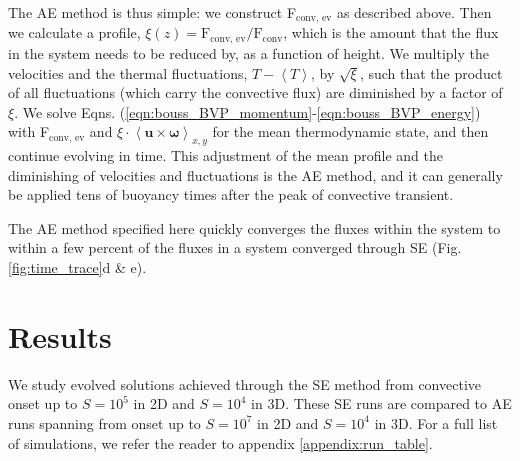 \documentclass[aps, pre, onecolumn, nofootinbib, notitlepage, groupedaddress, amsfonts, amssymb, amsmath, longbibliography]{revtex4-1}
\newcommand{\angles}[1]{\ensuremath{\left\langle #1 \right\rangle}}
\begin{document}
The AE method is thus simple: we construct F$_{\text{conv, ev}}$ as described above.
Then we calculate a profile, 
$\xi(z) = \text{F}_{\text{conv, ev}}/\text{F}_{\text{conv}}$, which is the amount that the
flux in the system needs to be reduced by, as a function of height.
We multiply the velocities
and the thermal fluctuations, $T - \angles{T}$, by $\sqrt{\xi}$, such that the product of all fluctuations
(which carry the convective flux) are diminished by a factor of $\xi$.  We solve
Eqns. (\ref{eqn:bouss_BVP_momentum}-\ref{eqn:bouss_BVP_energy}) with F$_{\text{conv, ev}}$
and $\xi\cdot\angles{\bm{u}\times\bm{\omega}}_{x,y}$ for the mean thermodynamic state,
and then continue evolving in time.  This adjustment of the mean profile and the
diminishing of velocities and fluctuations is the AE method, and it can generally
be applied tens of buoyancy times after the peak of convective transient.

The AE method specified here quickly converges the fluxes within the
system to within a few percent of the fluxes in a system converged through
SE (Fig. \ref{fig:time_trace}d \& e).

\section{Results}
\label{sec:results}
We study evolved solutions achieved through the SE method from convective onset
up to $S = 10^5$ in 2D and $S = 10^4$ in 3D.  These SE runs are compared to
AE runs spanning from onset up to $S = 10^7$ in 2D and $S = 10^4$ in 3D.
For a full list of simulations, we refer the reader to appendix \ref{appendix:run_table}.
\end{document}
